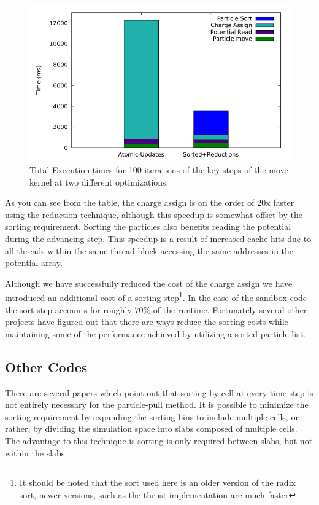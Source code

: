 \begin{figure}
\begin{center}
\includegraphics[width=5in]{design/atomic_vs_sorted.pdf}
\end{center}
\caption{Total Execution times for 100 iterations of the key steps of the move kernel at two different optimizations.}
\label{fig:GPUPIC_comparison}
\end{figure}




As you can see from the table, the charge assign is on the order of 20x faster using the reduction technique, although this speedup is somewhat offset by the sorting requirement. Sorting the particles also benefits reading the potential during the advancing step. This speedup is a result of increased cache hits due to all threads within the same thread block accessing the same addresses in the potential array. 

Although we have successfully reduced the cost of the charge assign we have introduced an additional cost of a sorting step\footnote{It should be noted that the sort used here is an older version of the radix sort, newer versions, such as the thrust implementation are much faster}. In the case of the sandbox code the sort step accounts for roughly 70\% of the runtime. Fortunately several other projects have figured out that there are ways reduce the sorting costs while maintaining some of the performance achieved by utilizing a sorted particle list. 

 
		\subsection{Other Codes}
There are several papers which point out that sorting by cell at every time step is not entirely necessary for the particle-pull method. It is possible to minimize the sorting requirement by expanding the sorting bins to include multiple cells, or rather, by dividing the simulation space into slabs composed of multiple cells. The advantage to this technique is sorting is only required between slabs, but not within the slabs.\cite{Abreu2011} 

